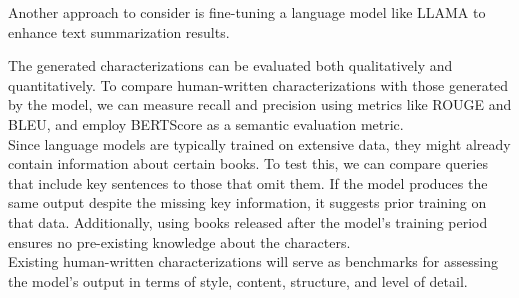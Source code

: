 Another approach to consider is fine-tuning a language model like LLAMA to enhance text summarization results.\

The generated characterizations can be evaluated both qualitatively and quantitatively. To compare human-written characterizations with those generated by the model, we can measure recall and precision using metrics like ROUGE and BLEU, and employ BERTScore as a semantic evaluation metric.\\

Since language models are typically trained on extensive data, they might already contain information about certain books. To test this, we can compare queries that include key sentences to those that omit them. If the model produces the same output despite the missing key information, it suggests prior training on that data. Additionally, using books released after the model's training period ensures no pre-existing knowledge about the characters.\\

Existing human-written characterizations will serve as benchmarks for assessing the model's output in terms of style, content, structure, and level of detail.